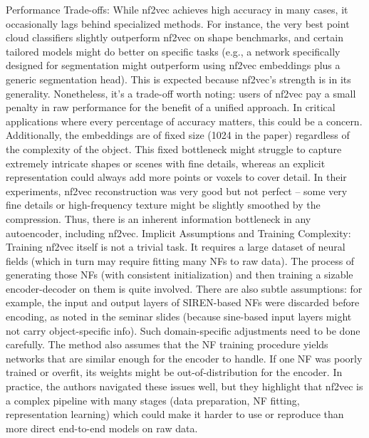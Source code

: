 \documentclass[11pt]{article}
\begin{document}
Performance Trade-offs: While nf2vec achieves high accuracy in many cases, it occasionally lags behind specialized methods. For instance, the very best point cloud classifiers slightly outperform nf2vec on shape benchmarks, and certain tailored models might do better on specific tasks (e.g., a network specifically designed for segmentation might outperform using nf2vec embeddings plus a generic segmentation head). This is expected because nf2vec’s strength is in its generality. Nonetheless, it’s a trade-off worth noting: users of nf2vec pay a small penalty in raw performance for the benefit of a unified approach. In critical applications where every percentage of accuracy matters, this could be a concern. Additionally, the embeddings are of fixed size (1024 in the paper) regardless of the complexity of the object. This fixed bottleneck might struggle to capture extremely intricate shapes or scenes with fine details, whereas an explicit representation could always add more points or voxels to cover detail. In their experiments, nf2vec reconstruction was very good but not perfect – some very fine details or high-frequency texture might be slightly smoothed by the compression. Thus, there is an inherent information bottleneck in any autoencoder, including nf2vec.
Implicit Assumptions and Training Complexity: Training nf2vec itself is not a trivial task. It requires a large dataset of neural fields (which in turn may require fitting many NFs to raw data). The process of generating those NFs (with consistent initialization) and then training a sizable encoder-decoder on them is quite involved. There are also subtle assumptions: for example, the input and output layers of SIREN-based NFs were discarded before encoding, as noted in the seminar slides (because sine-based input layers might not carry object-specific info). Such domain-specific adjustments need to be done carefully. The method also assumes that the NF training procedure yields networks that are similar enough for the encoder to handle. If one NF was poorly trained or overfit, its weights might be out-of-distribution for the encoder. In practice, the authors navigated these issues well, but they highlight that nf2vec is a complex pipeline with many stages (data preparation, NF fitting, representation learning) which could make it harder to use or reproduce than more direct end-to-end models on raw data.
\end{document}
